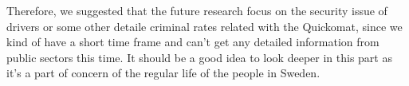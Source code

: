 \documentclass[twocolumn]{article}
\begin{document}
Therefore, we suggested that the future research focus on the security issue of drivers or some other detaile criminal rates related with the Quickomat, since we kind of have a short time frame and can't get any detailed information from public sectors this time. It should be a good idea to look deeper in this part as it's a part of concern of the regular life of the people in Sweden.




\end{document}

